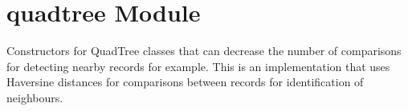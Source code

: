 \documentclass[letterpaper,10pt,english]{sphinxmanual}
\begin{document}
\section{quadtree Module}
\label{\detokenize{quadtree:module-GeoSpatialTools.quadtree}}\label{\detokenize{quadtree:quadtree-module}}
\sphinxAtStartPar
Constructors for QuadTree classes that can decrease the number of comparisons
for detecting nearby records for example. This is an implementation that uses
Haversine distances for comparisons between records for identification of
neighbours.
\end{document}
